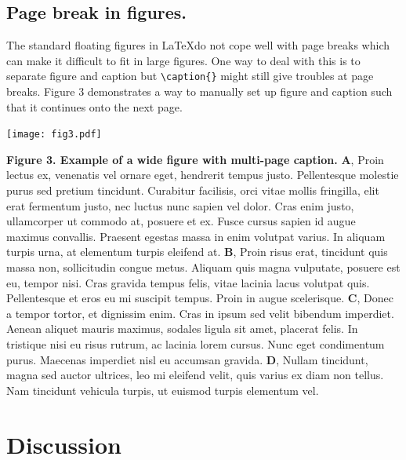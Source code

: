 \documentclass[10pt,letterpaper]{article}
\begin{document}
\subsection*{Page break in figures.}
The standard floating figures in \LaTeX do not cope well with page breaks which can make it difficult to fit in large figures. One way to deal with this is to separate figure and caption but \verb!\caption{}! might still give troubles at page breaks. Figure 3 demonstrates a way to manually set up figure and caption such that it continues onto the next page.
\vspace{.5cm} %
\begin{adjustwidth}{-2in}{0in}
\begin{flushright}
\texttt{[image: fig3.pdf]}
\end{flushright}
\justify 
\color{Gray}
\textbf {Figure 3. Example of a wide figure with multi-page caption.}
\textbf{A}, Proin lectus ex, venenatis vel ornare eget, hendrerit tempus justo. Pellentesque molestie purus sed pretium tincidunt. Curabitur facilisis, orci vitae mollis fringilla, elit erat fermentum justo, nec luctus nunc sapien vel dolor. Cras enim justo, ullamcorper ut commodo at, posuere et ex. Fusce cursus sapien id augue maximus convallis. Praesent egestas massa in enim volutpat varius. In aliquam turpis urna, at elementum turpis eleifend at. \textbf{B}, Proin risus erat, tincidunt quis massa non, sollicitudin congue metus. Aliquam quis magna vulputate, posuere est eu, tempor nisi. Cras gravida tempus felis, vitae lacinia lacus volutpat quis. Pellentesque et eros eu mi suscipit tempus. Proin in augue scelerisque. \textbf{C}, Donec a tempor tortor, et dignissim enim. Cras in ipsum sed velit bibendum imperdiet. Aenean aliquet mauris maximus, sodales ligula sit amet, placerat felis. In tristique nisi eu risus rutrum, ac lacinia lorem cursus. Nunc eget condimentum purus. Maecenas imperdiet nisl eu accumsan gravida. \textbf{D}, Nullam tincidunt, magna sed auctor ultrices, leo mi eleifend velit, quis varius ex diam non tellus. Nam tincidunt vehicula turpis, ut euismod turpis elementum vel.
\end{adjustwidth}



\section*{Discussion}
\end{document}
